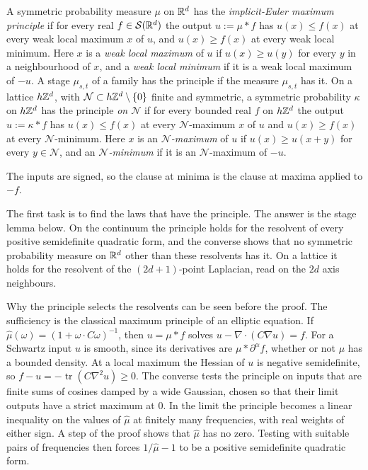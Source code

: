 \begin{definition}
\label{def:implicit-euler-principle}

A symmetric probability measure $\mu$ on $\mathbb{R}^d$ has the \emph{implicit-Euler maximum principle}
if for every real $f \in \mathcal{S}(\mathbb{R}^d)$ the output $u := \mu * f$ has $u(x) \le f(x)$ at every
weak local maximum $x$ of $u$, and $u(x) \ge f(x)$ at every weak local minimum. Here $x$ is a
\emph{weak local maximum} of $u$ if $u(x) \ge u(y)$ for every $y$ in a neighbourhood of $x$, and a
\emph{weak local minimum} if it is a weak local maximum of $-u$. A stage $\mu_{s,t}$ of a
family has the principle if the measure $\mu_{s,t}$ has it. On a lattice $h\mathbb{Z}^d$, with
$\mathcal{N} \subset h\mathbb{Z}^d \setminus \{0\}$ finite and symmetric, a symmetric probability $\kappa$
on $h\mathbb{Z}^d$ has the principle \emph{on $\mathcal{N}$} if for every bounded real $f$ on $h\mathbb{Z}^d$ the
output $u := \kappa * f$ has $u(x) \le f(x)$ at every $\mathcal{N}$-maximum $x$ of $u$ and
$u(x) \ge f(x)$ at every $\mathcal{N}$-minimum. Here $x$ is an \emph{$\mathcal{N}$-maximum} of $u$ if
$u(x) \ge u(x + y)$ for every $y \in \mathcal{N}$, and an \emph{$\mathcal{N}$-minimum} if it is an
$\mathcal{N}$-maximum of $-u$.
\end{definition}

The inputs are signed, so the clause at minima is the clause at maxima applied to $-f$.

The first task is to find the laws that have the principle. The answer is the stage lemma below.
On the continuum the principle holds for the resolvent of every positive semidefinite quadratic
form, and the converse shows that no symmetric probability measure on $\mathbb{R}^d$ other than these
resolvents has it. On a lattice it holds for the resolvent of the $(2d+1)$-point Laplacian, read on
the $2d$ axis neighbours.

Why the principle selects the resolvents can be seen before the proof. The sufficiency is the
classical maximum principle of an elliptic equation. If
$\widehat\mu(\omega) = (1 + \omega\cdot C\omega)^{-1}$, then $u = \mu * f$ solves
$u - \nabla\cdot(C\nabla u) = f$. For a Schwartz input $u$ is smooth, since its derivatives are
$\mu * \partial^\alpha f$, whether or not $\mu$ has a bounded density. At a local maximum the
Hessian of $u$ is negative semidefinite, so $f - u = -\operatorname{tr}(C\nabla^2u) \ge 0$. The
converse tests the principle on inputs that are finite sums of cosines damped by a wide Gaussian,
chosen so that their limit outputs have a strict maximum at $0$. In the limit the principle becomes
a linear inequality on the values of $\widehat\mu$ at finitely many frequencies, with real weights of
either sign. A step of the proof shows that $\widehat\mu$ has no zero. Testing with suitable pairs of
frequencies then forces $1/\widehat\mu - 1$ to be a positive semidefinite quadratic form.

